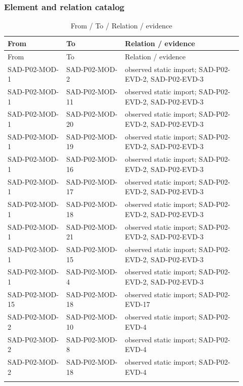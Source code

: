 \documentclass[10pt,letterpaper]{article}
\begin{document}
\subsubsection{Element and relation catalog}
\begin{longtable}{@{}>{\raggedright\arraybackslash}p{0.23\linewidth}>{\raggedright\arraybackslash}p{0.23\linewidth}>{\raggedright\arraybackslash}p{0.46\linewidth}@{}}
\caption{From / To / Relation / evidence}\\
\toprule From & To & Relation / evidence\\\midrule\endfirsthead
\toprule From & To & Relation / evidence\\\midrule\endhead
SAD-P02-MOD-1 & SAD-P02-MOD-2 & observed static import; SAD-P02-EVD-2, SAD-P02-EVD-3\\\addlinespace
SAD-P02-MOD-1 & SAD-P02-MOD-11 & observed static import; SAD-P02-EVD-2, SAD-P02-EVD-3\\\addlinespace
SAD-P02-MOD-1 & SAD-P02-MOD-20 & observed static import; SAD-P02-EVD-2, SAD-P02-EVD-3\\\addlinespace
SAD-P02-MOD-1 & SAD-P02-MOD-19 & observed static import; SAD-P02-EVD-2, SAD-P02-EVD-3\\\addlinespace
SAD-P02-MOD-1 & SAD-P02-MOD-16 & observed static import; SAD-P02-EVD-2, SAD-P02-EVD-3\\\addlinespace
SAD-P02-MOD-1 & SAD-P02-MOD-17 & observed static import; SAD-P02-EVD-2, SAD-P02-EVD-3\\\addlinespace
SAD-P02-MOD-1 & SAD-P02-MOD-18 & observed static import; SAD-P02-EVD-2, SAD-P02-EVD-3\\\addlinespace
SAD-P02-MOD-1 & SAD-P02-MOD-21 & observed static import; SAD-P02-EVD-2, SAD-P02-EVD-3\\\addlinespace
SAD-P02-MOD-1 & SAD-P02-MOD-15 & observed static import; SAD-P02-EVD-2, SAD-P02-EVD-3\\\addlinespace
SAD-P02-MOD-1 & SAD-P02-MOD-4 & observed static import; SAD-P02-EVD-2, SAD-P02-EVD-3\\\addlinespace
SAD-P02-MOD-15 & SAD-P02-MOD-18 & observed static import; SAD-P02-EVD-17\\\addlinespace
SAD-P02-MOD-2 & SAD-P02-MOD-10 & observed static import; SAD-P02-EVD-4\\\addlinespace
SAD-P02-MOD-2 & SAD-P02-MOD-8 & observed static import; SAD-P02-EVD-4\\\addlinespace
SAD-P02-MOD-2 & SAD-P02-MOD-18 & observed static import; SAD-P02-EVD-4\\\addlinespace

\end{longtable}
\end{document}
